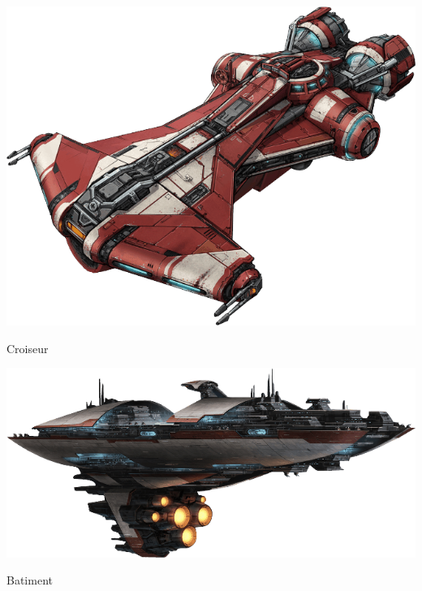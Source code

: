 \begin{center}
    \vspace*{\fill}
    \includegraphics[width=0.9\linewidth]{img/equipement/croiseur.png}
    \caption{Croiseur}
    \vspace*{\fill}
    \includegraphics[width=0.9\linewidth]{img/equipement/batiment.png}
    \caption{Batiment}
\end{center}